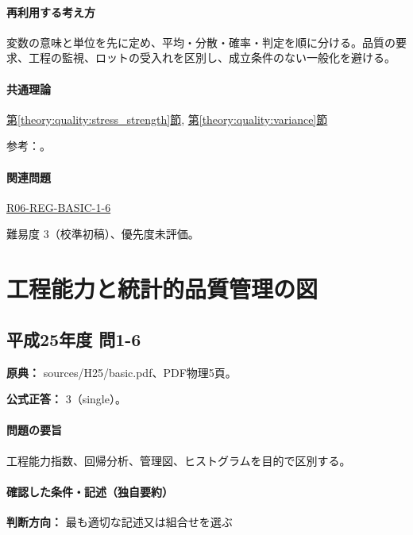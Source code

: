 \paragraph{再利用する考え方} 変数の意味と単位を先に定め、平均・分散・確率・判定を順に分ける。品質の要求、工程の監視、ロットの受入れを区別し、成立条件のない一般化を避ける。

\paragraph{共通理論} \hyperref[theory:quality:stress_strength]{第\ref*{theory:quality:stress_strength}節}, \hyperref[theory:quality:variance]{第\ref*{theory:quality:variance}節}

\par 参考：\cite{stat_nist_normal,stat_psu_linear}。

\paragraph{関連問題} \hyperref[q:r06-reg-basic-1-6]{R06-REG-BASIC-1-6}

\par 難易度 3（校準初稿）、優先度未評価。

\section{工程能力と統計的品質管理の図}

\subsection{平成25年度 問1-6}
\label{q:h25-reg-basic-1-6}

\noindent\textbf{原典：} sources/H25/basic.pdf、PDF物理5頁。

\textbf{公式正答：} 3（single）。

\paragraph{問題の要旨} 工程能力指数、回帰分析、管理図、ヒストグラムを目的で区別する。

\paragraph{確認した条件・記述（独自要約）}\mbox{}\par

\noindent\textbf{判断方向：} 最も適切な記述又は組合せを選ぶ\par

